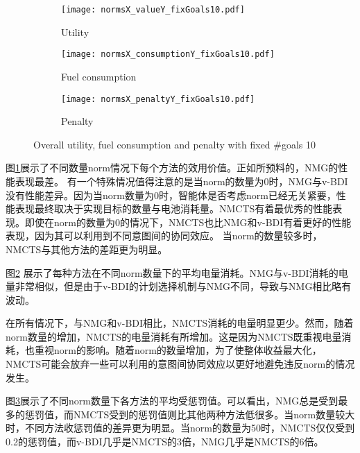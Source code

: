 \begin{figure}
\centering
\begin{subfigure}{.47\textwidth}
\centering
\texttt{[image: normsX\_valueY\_fixGoals10.pdf]}
\captionsetup{justification=centering}
\caption{Utility}
\label{fig:normsX_valueY_fixGoals10}
\end{subfigure}

\begin{subfigure}{.47\textwidth}
  \centering
  \texttt{[image: normsX\_consumptionY\_fixGoals10.pdf]}
  \captionsetup{justification=centering}
  \caption{Fuel consumption}
  \label{fig:normsX_consumptionY_fixGoals10}
\end{subfigure}
\begin{subfigure}{.47\textwidth}
  \centering
  \texttt{[image: normsX\_penaltyY\_fixGoals10.pdf]}
  \captionsetup{justification=centering}
  \caption{Penalty}
  \label{fig:normsX_penaltyY_fixGoals10}
\end{subfigure}
\captionsetup{justification=centering}
\caption{Overall utility, fuel consumption and penalty with fixed \#goals 10}
\label{fig:all_fixGoals10}
\end{figure}
图\ref{fig:normsX_valueY_fixGoals10}展示了不同数量norm情况下每个方法的效用价值。正如所预料的，NMG的性能表现最差。
有一个特殊情况值得注意的是当norm的数量为0时，NMG与v-BDI没有性能差异。因为当norm数量为0时，智能体是否考虑norm已经无关紧要，性能表现最终取决于实现目标的数量与电池消耗量。NMCTS有着最优秀的性能表现。即使在norm的数量为0的情况下，NMCTS也比NMG和v-BDI有着更好的性能表现，因为其可以利用到不同意图间的协同效应。
当norm的数量较多时，NMCTS与其他方法的差距更为明显。

图\ref{fig:normsX_consumptionY_fixGoals10} 展示了每种方法在不同norm数量下的平均电量消耗。NMG与v-BDI消耗的电量非常相似，但是由于v-BDI的计划选择机制与NMG不同，导致与NMG相比略有波动。

在所有情况下，与NMG和v-BDI相比，NMCTS消耗的电量明显更少。然而，随着norm数量的增加，NMCTS的电量消耗有所增加。这是因为NMCTS既重视电量消耗，也重视norm的影响。随着norm的数量增加，为了使整体收益最大化，NMCTS可能会放弃一些可以利用的意图间协同效应以更好地避免违反norm的情况发生。

图\ref{fig:normsX_penaltyY_fixGoals10}展示了不同norm数量下各方法的平均受惩罚值。可以看出，NMG总是受到最多的惩罚值，而NMCTS受到的惩罚值则比其他两种方法低很多。当norm数量较大时，不同方法收惩罚值的差异更为明显。当norm的数量为50时，NMCTS仅仅受到0.2的惩罚值，而v-BDI几乎是NMCTS的3倍，NMG几乎是NMCTS的6倍。

